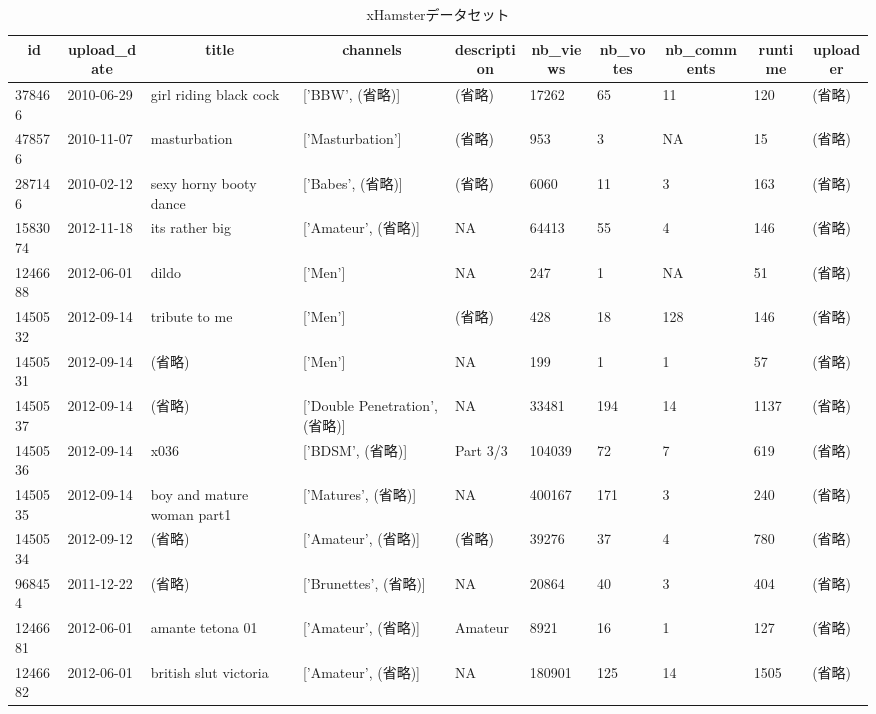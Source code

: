 \documentclass[uplatex]{jsarticle}
\begin{document}
\begin{landscape}
\begin{table}[htb]
\begin{center}
\caption{xHamsterデータセット}
    \begin{tabular}{llllllllll}
    \hline
    \multicolumn{1}{c}{id} & \multicolumn{1}{c}{upload\_date} & \multicolumn{1}{c}{title} & \multicolumn{1}{c}{channels} & \multicolumn{1}{c}{description} & \multicolumn{1}{c}{nb\_views} & \multicolumn{1}{c}{nb\_votes} & \multicolumn{1}{c}{nb\_comments} & \multicolumn{1}{c}{runtime} & \multicolumn{1}{c}{uploader} \\
    \hline
    378466 & 2010-06-29 & girl riding black cock & ['BBW', (省略)] & (省略) & 17262 & 65 & 11 & 120 & (省略) \\
    478576 & 2010-11-07 & masturbation & ['Masturbation'] & (省略) & 953 & 3 & NA & 15 & (省略) \\
    287146 & 2010-02-12 & sexy horny booty dance & ['Babes', (省略)] & (省略) & 6060 & 11 & 3 & 163 & (省略) \\
    1583074 & 2012-11-18 & its rather big & ['Amateur', (省略)] & NA & 64413 & 55 & 4 & 146 & (省略) \\
    1246688 & 2012-06-01 & dildo & ['Men'] & NA & 247 & 1 & NA & 51 & (省略) \\
    1450532 & 2012-09-14 & tribute to me & ['Men'] & (省略) & 428 & 18 & 128 & 146 & (省略) \\
    1450531 & 2012-09-14 & (省略) & ['Men'] & NA & 199 & 1 & 1 & 57 & (省略) \\
    1450537 & 2012-09-14 & (省略) & ['Double Penetration', (省略)] & NA & 33481 & 194 & 14 & 1137 & (省略) \\
    1450536 & 2012-09-14 & x036 & ['BDSM', (省略)] & Part 3/3 & 104039 & 72 & 7 & 619 & (省略) \\
    1450535 & 2012-09-14 & boy and mature woman part1 & ['Matures', (省略)] & NA & 400167 & 171 & 3 & 240 & (省略) \\
    1450534 & 2012-09-12 & (省略) & ['Amateur', (省略)] & (省略) & 39276 & 37 & 4 & 780 & (省略) \\
    968454 & 2011-12-22 & (省略) & ['Brunettes', (省略)] & NA & 20864 & 40 & 3 & 404 & (省略) \\
    1246681 & 2012-06-01 & amante tetona 01 & ['Amateur', (省略)] & Amateur & 8921 & 16 & 1 & 127 & (省略) \\
    1246682 & 2012-06-01 & british slut victoria & ['Amateur', (省略)] & NA & 180901 & 125 & 14 & 1505 & (省略) \\

\end{tabular}
\end{center}
\end{table}
\end{landscape}
\end{document}

